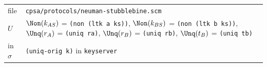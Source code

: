 \par\smallskip\noindent\begin{tabular}{@{}l p{}@{}}
file & \texttt{cpsa/protocols/neuman-stubblebine.scm}\\
$U$ & $\Non(k_{AS})$ = \texttt{(non (ltk a ks))}, $\Non(k_{BS})$ = \texttt{(non (ltk b ks))}, $\Unq(r_A)$ = \texttt{(uniq ra)}, $\Unq(r_B)$ = \texttt{(uniq rb)}, $\Unq(t_B)$ = \texttt{(uniq tb)}\\
in $\sigma$ & \texttt{(uniq-orig k)} in \texttt{keyserver}\\
\end{tabular}

